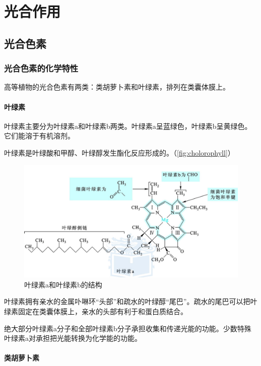 \section{光合作用}

\subsection{光合色素}

\subsubsection{光合色素的化学特性}

高等植物的光合色素有两类：类胡萝卜素和叶绿素，排列在类囊体膜上。

\paragraph{叶绿素}

叶绿素主要分为叶绿素a和叶绿素b两类。叶绿素a呈蓝绿色，叶绿素b呈黄绿色。它们能溶于有机溶剂。



叶绿素是叶绿酸和甲醇、叶绿醇发生酯化反应形成的。（\autoref{fig:cholorophyll}）

\begin{figure}[htbp]
	\centering
	\includegraphics[width=0.9\linewidth]{Pics/叶绿素a和叶绿素b}
	\caption{叶绿素a和叶绿素b的结构}
	\label{fig:cholorophyll}
\end{figure}

叶绿素拥有亲水的金属卟啉环“头部”和疏水的叶绿醇“尾巴”。疏水的尾巴可以把叶绿素固定在类囊体膜上，亲水的头部有利于和蛋白质结合。

绝大部分叶绿素a分子和全部叶绿素b分子承担收集和传递光能的功能。少数特殊叶绿素a对承担把光能转换为化学能的功能。

\paragraph{类胡萝卜素}

